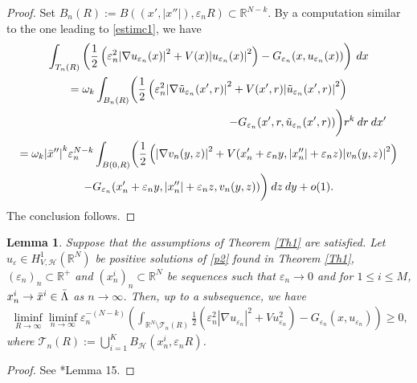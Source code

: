 \documentclass[a4paper]{amsart}
\newtheorem{lemma}[proposition]{Lemma}
\begin{document}
\begin{proof}
Set $B_n(R) := B((x',{\left| {x''} \right|}),\varepsilon_n R) \subset {\mathbb{R}}^{N-k}$. By a computation similar to the one
leading to \eqref{estimc1}, we have
\begin{multline*}
\int_{T_n(R)} \left( \frac{1}{2} \left( \varepsilon_n^2 {\left| {\nabla u_{\varepsilon_n}(x)} \right|}^2 +
V(x){\left| {u_{\varepsilon_n}(x)} \right|}^2 \right) - G_{\varepsilon_n}(x,u_{\varepsilon_n}(x)) \right)\: dx \\ 
 = \omega_k \int_{B_n(R)} \biggl( \frac{1}{2} \left( \varepsilon_n^2 {\left| {\nabla \Tilde{u}_{\varepsilon_n}(x',r)} \right|}^2 +
V(x',r){\left| {\Tilde{u}_{\varepsilon_n}(x',r)} \right|}^2 \right)\\
\shoveright{- G_{\varepsilon_n}(x', r,\Tilde{u}_{\varepsilon_n}(x',r)) \biggr) r^k\:
dr\: dx'} \\
 = \omega_k {\left| {\bar{x}''} \right|}^k \varepsilon_n^{N-k} \int_{B(0,R)} \biggl( \frac{1}{2} \left( {\left| {\nabla v_n(y, z)} \right|}^2 +
V(x'_n + \varepsilon_n y, {\left| {x''_n} \right|} + \varepsilon_n z){\left| {v_n(y, z)} \right|}^2 \right) \\ 
- G_{\varepsilon_n}(x'_{n} +
\varepsilon_n y, {\left| {x''_{n}} \right|} + \varepsilon_n z,v_n(y, z)) \biggr)\: dz\: dy + o(1).
 \end{multline*}
The conclusion follows.
\end{proof}

\begin{lemma}
 Suppose that the assumptions of Theorem \ref{Th1} are satisfied. Let $u_{\varepsilon}\in H^1_{V,\mathcal{H}}({\mathbb{R}}^N)$ be
positive solutions of \eqref{p2} found in Theorem \ref{Th1}, $(\varepsilon_n)_n \subset {\mathbb{R}}^+$ and $(x^i_n)_n \subset
{\mathbb{R}}^N$ be sequences such that $\varepsilon_n \to 0$ and for $1\leq i \leq M$, $x^i_n\to
\bar{x}^i \in \Bar{\Lambda}$ as $n\to \infty$. Then, up to a subsequence, we have
\begin{align*}
  \liminf_{R\to\infty}\liminf_{n\to\infty} \varepsilon_n^{-(N-k)} \left( \int_{{\mathbb{R}}^N\setminus \mathcal{T}_n(R)} 
\frac{1}{2} \left( \varepsilon_n^2 {\left| {\nabla u_{\varepsilon_n}} \right|}^2 + V u_{\varepsilon_n}^2 \right) -
G_{\varepsilon_n}(x,u_{\varepsilon_n}) \right) \geq 0,
\end{align*}
where $\mathcal{T}_n(R) := \bigcup_{i=1}^K B_{\mathcal{H}}(x^i_n,\varepsilon_n R)$.
\end{lemma}
\begin{proof}
 See \cite{BVS}*{Lemma 15}.
\end{proof}
\end{document}

